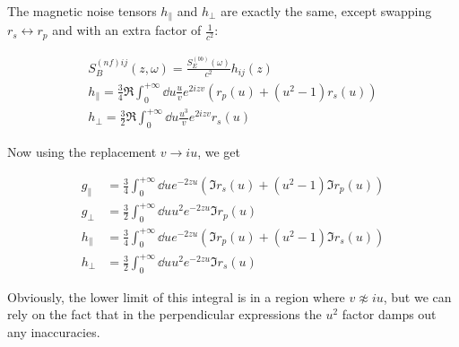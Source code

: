 \documentclass[../main.tex]{subfiles}
\begin{document}
	The magnetic noise tensors $h_\parallel$ and $h_\perp$ are exactly the same, except swapping $r_s \leftrightarrow r_p$ and with an extra factor of $\frac{1}{c^2}$:

	\begin{gather}
		S^{(nf)ij}_B(z, \omega) = \frac{S^{(bb)}_E(\omega)}{c^2} h_{ij}(z) \\
		h_\parallel = \frac34 \Re \int_0^{+\infty} \dd{u} \frac{u}{v} e^{2i z v} \left(r_p(u) + \left(u^2 - 1\right) r_s(u) \right) \\
		h_\perp = \frac32 \Re \int_0^{+\infty} \dd{u} \frac{u^3}{v} e^{2 i z v} r_s(u)
	\end{gather}

	Now using the replacement $v \rightarrow iu$, we get

	\begin{align}
		g_\parallel &= \frac34 \int_0^{+\infty} \dd{u} e^{- 2 z u} \left(\Im r_s(u) + \left(u^2 - 1\right) \Im r_p(u) \right) \\
		g_\perp &= \frac32 \int_0^{+\infty} \dd{u} u^2 e^{- 2 z u} \Im r_p(u) \\
		h_\parallel &= \frac34 \int_0^{+\infty} \dd{u} e^{- 2 z u} \left(\Im r_p(u) + \left(u^2 - 1\right) \Im r_s(u) \right) \\
		h_\perp &= \frac32 \int_0^{+\infty} \dd{u} u^2 e^{-2 z u} \Im r_s(u)
	\end{align}

	Obviously, the lower limit of this integral is in a region where $v \not\approx iu$, but we can rely on the fact that in the perpendicular expressions the $u^2$ factor damps out any inaccuracies.
\end{document}

